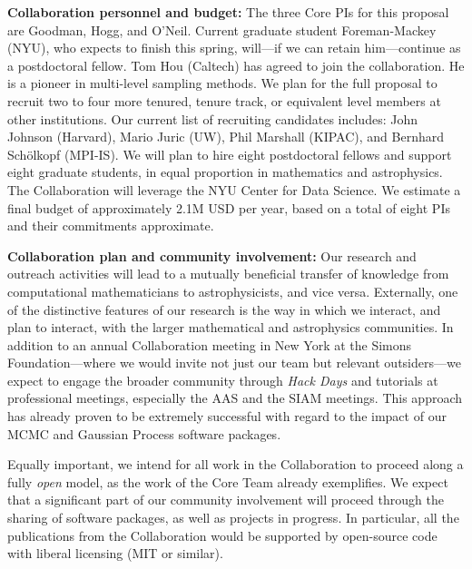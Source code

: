 \documentclass[11pt]{article}
\renewcommand{\paragraph}[1]{\smallskip\par\noindent\textbf{{#1}:}}
\begin{document}
\paragraph{Collaboration personnel and budget}
The three Core PIs for this proposal are Goodman, Hogg, and O'Neil.
Current graduate student Foreman-Mackey (NYU), who expects to finish
this spring, will---if we can retain him---continue as a postdoctoral
fellow.
Tom Hou (Caltech) has agreed to join the collaboration.
He is a pioneer in multi-level sampling methods.
We plan for the full proposal to recruit two to four more tenured,
tenure track, or equivalent level members at other institutions.  Our
current list of recruiting candidates includes: John
Johnson (Harvard), Mario Juric (UW), Phil Marshall (KIPAC), and Bernhard
Sch\"olkopf (MPI-IS).
We will plan to hire eight postdoctoral fellows and support eight
graduate students, in equal proportion in mathematics and astrophysics.
The Collaboration will leverage the NYU Center for Data Science.
We estimate a final budget of approximately 2.1M USD per year,
based on a total of eight PIs and their commitments approximate.

\paragraph{Collaboration plan and community involvement}
Our research and outreach activities will lead to a mutually beneficial
transfer of knowledge from computational mathematicians to
astrophysicists, and vice versa.
Externally, one of the distinctive features of our research is the way
in which we interact, and plan to interact, with the larger mathematical
and astrophysics communities.
In addition to an annual Collaboration meeting in New York at the Simons
Foundation---where we would invite not just our team but relevant
outsiders---we expect to engage the broader community through \emph{Hack
Days} and tutorials at professional meetings, especially the AAS and the SIAM meetings.
This approach has already proven to be extremely successful with regard
to the impact of our MCMC and Gaussian Process software packages.

Equally important, we intend for all work in the Collaboration to
proceed along a fully \emph{open} model, as the work of the Core Team
already exemplifies.
We expect that a significant part of our community involvement will
proceed through the sharing of software packages, as well as projects in
progress.
In particular, all the publications from the Collaboration would be
supported by open-source code with liberal licensing (MIT or similar).
\end{document}
